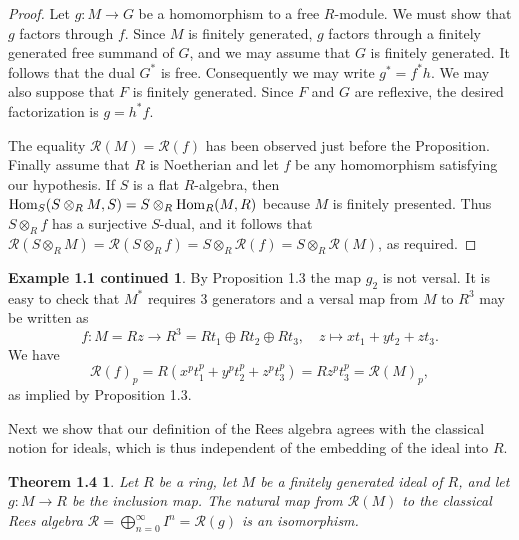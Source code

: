 \documentclass{proc-l}
\theoremstyle{plain}
\newtheorem*{theorem3}{Theorem 1.4}
\theoremstyle{definition}
\newtheorem*{definition4}{Example 1.1 continued}
\newcommand{\R}{\mathcal R}
\newcommand{\ra}{\rightarrow }
\newcommand{\Hom}{\hbox {\rm Hom}}
\begin{document}
\begin{proof} Let $g \colon M\to G$ be a homomorphism to a free
$R$-module. We must show that $g$ factors through $f$. Since $M$
is finitely generated, $g$ factors through a finitely generated
free summand of $G$, and we may assume that $G$ is finitely
generated. It follows that the dual $G^{*}$ is free. Consequently we
may write $g^{*}=f^{*}h$. We may also suppose that $F$ is finitely
generated. Since $F$ and $G$ are reflexive, the desired
factorization is $g=h^{*}f$.

The equality $\R (M)=\R (f)$ has been observed just
before the Proposition. Finally
assume that $R$ is Noetherian and let $f$ be any homomorphism
satisfying our hypothesis. If $S$ is a flat $R$-algebra, then
$\Hom _{S} (S\otimes _{R} M,S)=S\otimes _{R} \Hom _{R}(M,R)$ because $M$ is
finitely presented. Thus $S\otimes _{R} f$ has a surjective $S$-dual,
and it follows that $\R (S\otimes _{R} M)=\R (S\otimes _{R} f)=S\otimes _{R}
\R (f)=S\otimes _{R} \R (M)$, as required. \end{proof}


\begin{definition4} By Proposition 1.3 the map
$g_{2}$ is not versal. It is easy to check that $M^{*}$ requires 3
generators and a versal map from $M$ to $R^{3}$ may be written as
\begin{equation*}f \colon M=Rz \ra R^{3} = Rt_{1} \oplus Rt_{2} \oplus Rt_{3},
\quad z\mapsto xt_{1}+yt_{2}+zt_{3}.
\end{equation*}
We have
\begin{equation*}\R (f)_{p} = R(x^{p} t_{1}^{p} + y^{p} t_{2}^{p}  + z^{p} t_{3}^{p}) = Rz^{p}t^{p}_{3} =
\R (M)_{p},
\end{equation*}
as implied by Proposition 1.3.
\end{definition4}


Next we show that our definition of the Rees algebra agrees with
the classical notion for ideals, which is thus independent of the
embedding of the ideal into $R$.

\begin{theorem3} Let $R$ be a ring, let $M$ be a finitely
generated ideal of $R$, and let $g \colon M\to R$ be the inclusion
map. The natural map  from $\R (M)$ to the classical Rees algebra
$\R =\bigoplus _{n=0}^{\infty }I^{n}=\R (g)$ is an isomorphism.
\end{theorem3}
\end{document}
